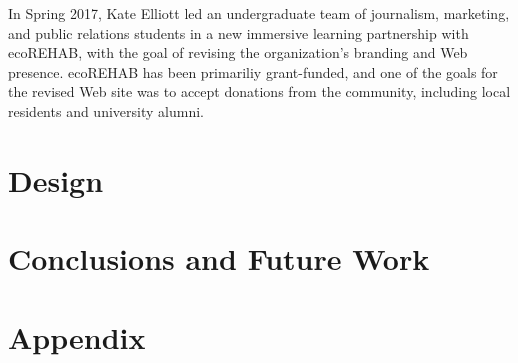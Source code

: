 \documentclass[letter]{article}
\begin{document}
In Spring 2017, Kate Elliott led an undergraduate team of journalism,
marketing, and public relations students in a new immersive learning
partnership with ecoREHAB, with the goal of revising the organization's
branding and Web presence.
ecoREHAB has been primariliy grant-funded, and one of the 
goals for the revised Web site was to accept donations from
the community, including local residents and university alumni.


\section*{Design}

\section*{Conclusions and Future Work}

\section*{Appendix}
\end{document}
